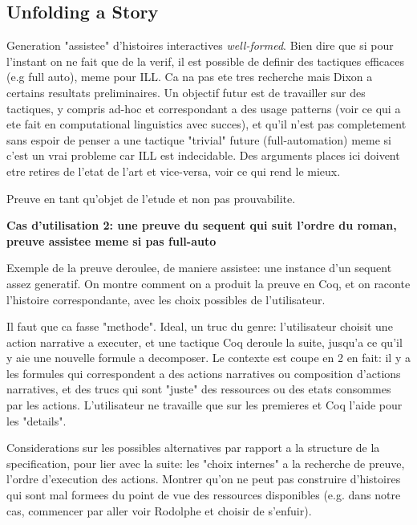 \documentclass[runningheads,a4paper]{llncs}
\begin{document}
\subsection{Unfolding a Story}
Generation "assistee" d'histoires interactives \emph{well-formed}. Bien dire que si pour l'instant on ne fait que de la verif, il est possible de definir des tactiques efficaces (e.g full auto), meme pour ILL. Ca na pas ete tres recherche mais Dixon a certains resultats preliminaires. Un objectif futur est de travailler sur des tactiques, y compris ad-hoc et correspondant a des usage patterns (voir ce qui a ete fait en computational linguistics avec succes), et qu'il n'est pas completement sans espoir de penser a une tactique "trivial" future (full-automation) meme si c'est un vrai probleme car ILL est indecidable. Des arguments places ici doivent etre retires de l'etat de l'art et vice-versa, voir ce qui rend le mieux.

Preuve en tant qu'objet de l'etude et non pas prouvabilite.

\textbf{Cas d'utilisation 2: une preuve du sequent qui suit l'ordre du roman, preuve assistee meme si pas full-auto}

Exemple de la preuve deroulee, de maniere assistee: une instance d'un sequent assez generatif. On montre comment on a produit la preuve en Coq, et on raconte l'histoire correspondante, avec les choix possibles de l'utilisateur. 

Il faut que ca fasse "methode". Ideal, un truc du genre: l'utilisateur choisit une action narrative a executer, et une tactique Coq deroule la suite, jusqu'a ce qu'il y aie une nouvelle formule a decomposer. Le contexte est coupe en 2 en fait: il y a les formules qui correspondent a des actions narratives ou composition d'actions narratives, et des trucs qui sont "juste" des ressources ou des etats consommes par les actions. L'utilisateur ne travaille que sur les premieres et Coq l'aide pour les "details".

Considerations sur les possibles alternatives par rapport a la structure de la specification, pour lier avec la suite: les "choix internes" a la recherche de preuve, l'ordre d'execution des actions. Montrer qu'on ne peut pas construire d'histoires qui sont mal formees du point de vue des ressources disponibles (e.g. dans notre cas, commencer par aller voir Rodolphe et choisir de s'enfuir).
\end{document}
